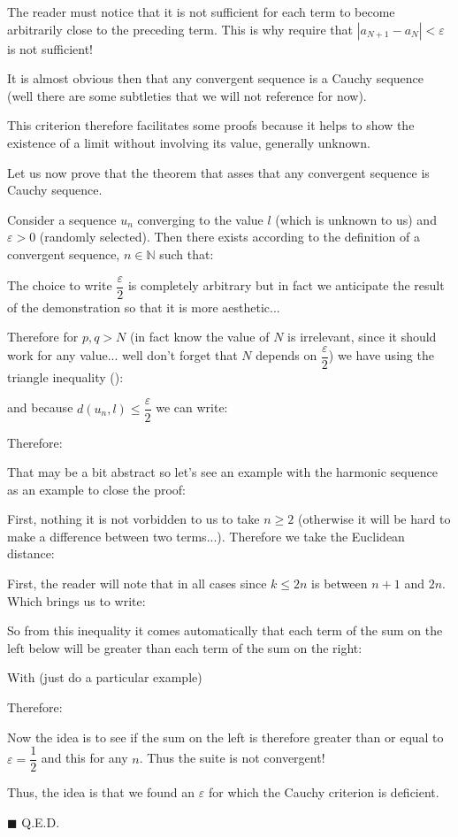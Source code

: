 	The reader must notice that it is not sufficient for each term to become arbitrarily close to the preceding term. This is why require that $|a_{N+1} - a_{N}| < \varepsilon$ is not sufficient!

	It is almost obvious then that any convergent sequence is a Cauchy sequence (well there are some subtleties that we will not reference for now).

	\begin{tcolorbox}[title=Remark,colframe=black,arc=10pt]
This criterion therefore facilitates some proofs because it helps to show the existence of a limit without involving its value, generally unknown.
	\end{tcolorbox}
	
	\begin{theorem}
	Let us now prove that the theorem that asses that any convergent sequence is Cauchy sequence.
	\end{theorem}
	\begin{dem}
	Consider a sequence $u_n$ converging to the value $l$ (which is unknown to us) and $\varepsilon>0$ (randomly selected). Then there exists according to the definition of a convergent sequence, $n \in \mathbb{N}$ such that:
	
	The choice to write $\dfrac{\varepsilon}{2}$ is completely arbitrary but in fact we anticipate the result of the demonstration so that it is more aesthetic...
	
	Therefore for $p,q>N$ (in fact know the value of $N$ is irrelevant, since it should work for any value... well don't forget that $N$ depends on $\dfrac{\varepsilon}{2}$) we have using the triangle inequality ():
	
	and because $d(u_n,l)\leq\dfrac{\varepsilon}{2}$ we can write:
	
	Therefore:
	
	That may be a bit abstract so let's see an example with the harmonic sequence as an example to close the proof:
	
	First, nothing it is not vorbidden to us to take $n \geq 2$ (otherwise it will be hard to make a difference between two terms...).
	Therefore we take the Euclidean distance:
	
	First, the reader will note that in all cases since $k\leq 2n$ is between $n+1$ and $2n$. Which brings us to write:
	
	So from this inequality it comes automatically that each term of the sum on the left below will be greater than each term of the sum on the right:
	
	With (just do a particular example)
	
	Therefore:
		
	Now the idea is to see if the sum on the left is therefore greater than or equal to $\varepsilon=\dfrac{1}{2}$ and this for any $n$. Thus the suite is not convergent!
	
	Thus, the idea is that we found an $\varepsilon$ for which the Cauchy criterion is deficient.
	\begin{flushright}
		$\blacksquare$  Q.E.D.
	\end{flushright}
	\end{dem}
